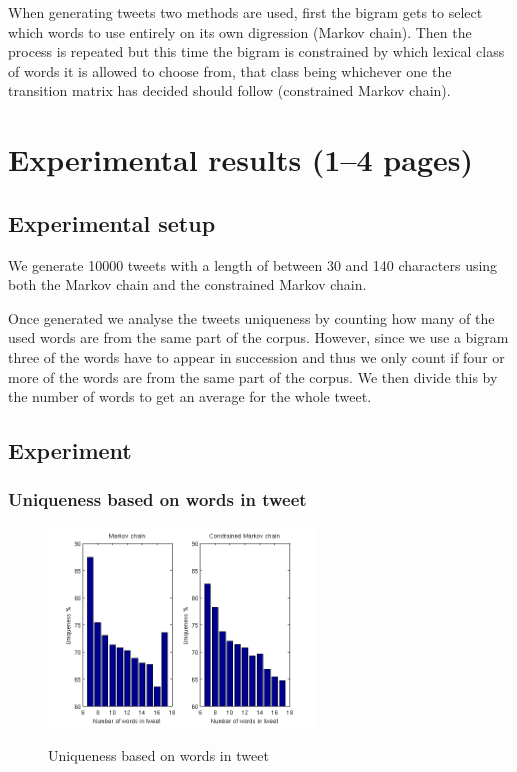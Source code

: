 \documentclass[a4paper,12pt]{article}
\begin{document}
When generating tweets two methods are used, first the bigram gets to select which words to use entirely on its own digression (Markov chain). Then the process is repeated but this time the bigram is constrained by which lexical class of words it is allowed to choose from, that class being whichever one the transition matrix has decided should follow (constrained Markov chain).

\section{Experimental results (1--4 pages)}
\label{sec:exps}

\subsection{Experimental setup}
We generate 10000 tweets with a length of between 30 and 140 characters using both the Markov chain and the constrained Markov chain.

Once generated we analyse the tweets uniqueness by counting how many of the used words are from the same part of the corpus. However, since we use a bigram three of the words have to appear in succession and thus we only count if four or more of the words are from the same part of the corpus. We then divide this by the number of words to get an average for the whole tweet.

\subsection{Experiment}

\subsubsection{Uniqueness based on words in tweet}

\begin{figure}[h!]
  \hfill
  {\includegraphics[width=1\linewidth, height = 200]{UniqByNumWordsTweet.png}}
  \caption{Uniqueness based on words in tweet}
 \end{figure}
 
\end{document}
